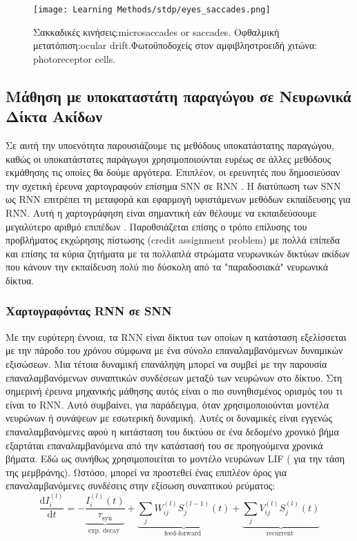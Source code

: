 \documentclass[12pt]{report}
\begin{document}
\begin{figure}[htp]
    \centering
    \texttt{[image: Learning Methods/stdp/eyes\_saccades.png]}
    \caption{Σακκαδικές κινήσεις:\textlatin{microsaccades or saccades}. Οφθαλμική μετατόπιση:\textlatin{ocular drift}.Φωτοϋποδοχείς στον αμφιβληστροειδή χιτώνα: \textlatin{photoreceptor cells}.}
    \label{fig:eyes_saccades}
\end{figure}

\subsection{Μάθηση με υποκαταστάτη παραγώγου σε Νευρωνικά Δίκτα Ακίδων}

Σε αυτή την υποενότητα παρουσιάζουμε τις μεθόδους υποκατάστατης παραγώγου, καθώς οι υποκατάστατες παράγωγοι χρησιμοποιούνται ευρέως σε άλλες μεθόδους εκμάθησης τις οποίες θα δούμε αργότερα. Επιπλέον, οι ερευνητές που δημοσιεύσαν την σχετική έρευνα χαρτογραφούν επίσημα \textlatin{SNN} σε \textlatin{RNN} \cite{neftci2019}. Η διατύπωση των \textlatin{SNN} ως \textlatin{RNN} επιτρέπει τη μεταφορά και εφαρμογή υφιστάμενων μεθόδων εκπαίδευσης για \textlatin{RNN}. Αυτή η χαρτογράφηση είναι σημαντική εάν θέλουμε να εκπαιδεύσουμε μεγαλύτερο αριθμό επιπέδων . Παροθσιάζεται επίσης ο τρόπο επίλυσης του προβλήματος εκχώρησης πίστωσης (\textlatin{credit assignment problem}) με πολλά επίπεδα και επίσης τα κύρια ζητήματα με τα πολλαπλά στρώματα νευρωνικών δικτύων ακίδων που κάνουν την εκπαίδευση πολύ πιο δύσκολη από τα "παραδοσιακά" νευρωνικά δίκτυα. 

\subsubsection{Χαρτογραφόντας \textlatin{RNN} σε \textlatin{SNN}}

Με την ευρύτερη έννοια, τα \textlatin{RNN} είναι δίκτυα των οποίων η κατάσταση εξελίσσεται με την πάροδο του χρόνου σύμφωνα με ένα σύνολο επαναλαμβανόμενων δυναμικών εξισώσεων. Μια τέτοια δυναμική επανάληψη μπορεί να συμβεί με την παρουσία επαναλαμβανόμενων συναπτικών συνδέσεων μεταξύ των νευρώνων στο δίκτυο. Στη σημερινή έρευνα μηχανικής μάθησης αυτός είναι ο πιο συνηθισμένος ορισμός του τι είναι το \textlatin{RNN}. Αυτό συμβαίνει, για παράδειγμα, όταν χρησιμοποιούνται μοντέλα νευρώνων ή συνάψεων με εσωτερική δυναμική. Αυτές οι δυναμικές είναι εγγενώς επαναλαμβανόμενες αφού η κατάσταση του δικτύου σε ένα δεδομένο χρονικό βήμα εξαρτάται επαναλαμβανόμενα από την κατάστασή του σε προηγούμενα χρονικά βήματα. Εδώ ως συνήθως χρησιμοποιείται το μοντέλο νευρώνων \textlatin{LIF} ( για την τάση της μεμβράνης). Ωστόσο, μπορεί να προστεθεί ένας επιπλέον όρος για επαναλαμβανόμενες συνδέσεις στην εξίσωση συναπτικού ρεύματος:
\begin{equation}
\label{eqn:surrogate_current_dynamics}
\frac{\mathrm{d} I_{i}^{(l)}}{\mathrm{d} t}=-\underbrace{\frac{I_{i}^{(l)}(t)}{\tau_{\mathrm{syn}}}}_{\text {exp. decay }}+\underbrace{\sum_{j} W_{i j}^{(l)} S_{j}^{(l-1)}(t)}_{\text {feed-forward }}+\underbrace{\sum_{j} V_{i j}^{(l)} S_{j}^{(l)}(t)}_{\text {recurrent }}
\end{equation}
\end{document}
